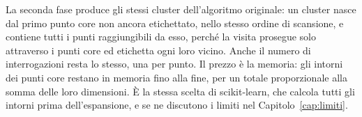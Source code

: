 La seconda fase produce gli stessi cluster dell'algoritmo originale: un cluster nasce dal primo punto core non ancora etichettato, nello stesso ordine di scansione, e contiene tutti i punti raggiungibili da esso, perché la visita prosegue solo attraverso i punti core ed etichetta ogni loro vicino. Anche il numero di interrogazioni resta lo stesso, una per punto. Il prezzo è la memoria: gli intorni dei punti core restano in memoria fino alla fine, per un totale proporzionale alla somma delle loro dimensioni. È la stessa scelta di scikit-learn, che calcola tutti gli intorni prima dell'espansione, e se ne discutono i limiti nel Capitolo~\ref{cap:limiti}.

